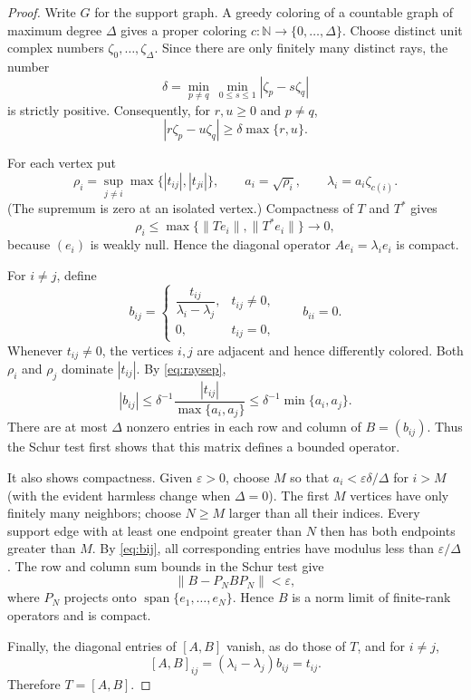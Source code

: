 \documentclass[11pt]{article}
\newcommand{\N}{\mathbb N}
\begin{document}
\begin{proof}
Write $G$ for the support graph.  A greedy coloring of a countable graph of
maximum degree $\Delta$ gives a proper coloring
$c:\N\to\{0,\ldots,\Delta\}$.  Choose distinct unit complex numbers
$\zeta_0,\ldots,\zeta_\Delta$.  Since there are only finitely many distinct
rays, the number
\[
 \delta=\min_{p\ne q}\ \min_{0\le s\le1}
       |\zeta_p-s\zeta_q|
\]
is strictly positive.  Consequently, for $r,u\ge0$ and $p\ne q$,
\begin{equation}\label{eq:raysep}
 |r\zeta_p-u\zeta_q|\ge\delta\max\{r,u\}.
\end{equation}

For each vertex put
\[
 \rho_i=\sup_{j\ne i}\max\{|t_{ij}|,|t_{ji}|\},
 \qquad a_i=\sqrt{\rho_i},
 \qquad \lambda_i=a_i\zeta_{c(i)}.
\]
(The supremum is zero at an isolated vertex.)  Compactness of $T$ and $T^*$
gives
\[
 \rho_i\le\max\{\|Te_i\|,\|T^*e_i\|\}\longrightarrow0,
\]
because $(e_i)$ is weakly null.  Hence the diagonal operator
$Ae_i=\lambda_i e_i$ is compact.

For $i\ne j$, define
\[
 b_{ij}=\begin{cases}
 \dfrac{t_{ij}}{\lambda_i-\lambda_j},&t_{ij}\ne0,\\[6pt]
 0,&t_{ij}=0,
 \end{cases}
 \qquad b_{ii}=0.
\]
Whenever $t_{ij}\ne0$, the vertices $i,j$ are adjacent and hence differently
colored.  Both $\rho_i$ and $\rho_j$ dominate $|t_{ij}|$.  By
\eqref{eq:raysep},
\begin{equation}\label{eq:bij}
 |b_{ij}|
 \le \delta^{-1}\frac{|t_{ij}|}{\max\{a_i,a_j\}}
 \le \delta^{-1}\min\{a_i,a_j\}.
\end{equation}
There are at most $\Delta$ nonzero entries in each row and column of
$B=(b_{ij})$.  Thus the Schur test first shows that this matrix defines a
bounded operator.

It also shows compactness.  Given $\varepsilon>0$, choose $M$ so that
$a_i<\varepsilon\delta/\Delta$ for $i>M$ (with the evident harmless change
when $\Delta=0$).  The first $M$ vertices have only finitely many neighbors;
choose $N\ge M$ larger than all their indices.  Every support edge with at
least one endpoint greater than $N$ then has both endpoints greater than
$M$.  By \eqref{eq:bij}, all corresponding entries have modulus less than
$\varepsilon/\Delta$.  The row and column sum bounds in the Schur test give
\[
 \|B-P_NBP_N\|<\varepsilon,
\]
where $P_N$ projects onto $\operatorname{span}\{e_1,\ldots,e_N\}$.  Hence
$B$ is a norm limit of finite-rank operators and is compact.

Finally, the diagonal entries of $[A,B]$ vanish, as do those of $T$, and for
$i\ne j$,
\[
 [A,B]_{ij}=(\lambda_i-\lambda_j)b_{ij}=t_{ij}.
\]
Therefore $T=[A,B]$.
\end{proof}
\end{document}
